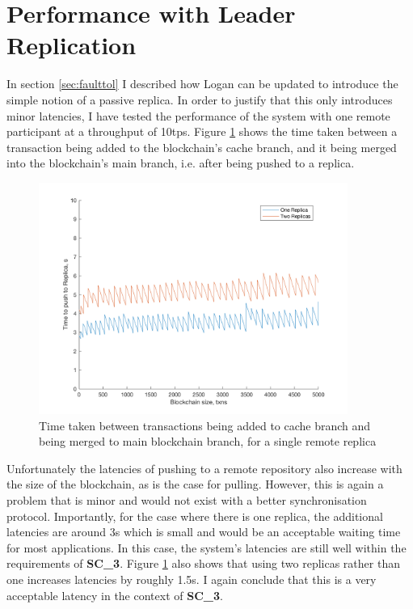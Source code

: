 \documentclass[12pt,a4paper,twoside,openright]{report}
\begin{document}
	\section{Performance with Leader Replication}
	In section \ref{sec:faulttol} I described how Logan can be updated to introduce the simple notion of a passive replica. 
	In order to justify that this only introduces minor latencies, I have tested the performance of the system with one remote participant at a throughput of 10tps. 
	Figure \ref{figs:confirmationtimes}  shows the time taken between a transaction being added to the blockchain's cache branch, and it being merged into the blockchain's main branch, i.e. after being pushed to a replica.
	\begin{figure}
		\centering
		\includegraphics[width=0.9\textwidth]{figs/confirmationlatencies.png}
		\caption{Time taken between transactions being added to cache branch and being merged to main blockchain branch, for a single remote replica}
		\label{figs:confirmationtimes}
	\end{figure}
	Unfortunately the latencies of pushing to a remote repository also increase with the size of the blockchain, as is the case for pulling.
	However, this is again a problem that is minor and would not exist with a better synchronisation protocol. 
	Importantly, for the case where there is one replica, the additional latencies are around 3s which is small and would be an acceptable waiting time for most applications.
	In this case, the system's latencies are still well within the requirements of \textbf{SC\_3}.
	Figure \ref{figs:confirmationtimes} also shows that using two replicas rather than one increases latencies by roughly 1.5s. 
	I again conclude that this is a very acceptable latency in the context of \textbf{SC\_3}. \\
\end{document}
